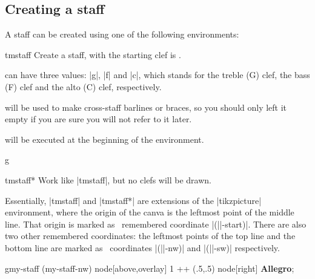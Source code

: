 \subsection{Creating a staff}\label{sec:init:staff-creation}
A staff can be created using one of the following environments:
\begin{environment}{{tmstaff}}
  Create a staff, with the starting clef is .

   can have three values: |g|, |f| and |c|, which stands for 
  the treble (G) clef, the bass (F) clef and the alto (C) clef, respectively.

   will be used to make cross-staff barlines or braces, so 
  you should only left it empty if you are sure you will not refer to it later.

   will be executed at the beginning of the environment.
\end{environment}
\begin{codeexample}[]
\begin{tmline}[staff offset=1cm]
\begin{tmstaff}{g}{}\end{tmstaff}
\end{tmline}
\end{codeexample}
\begin{environment}{{tmstaff*}}
  Work like |{tmstaff}|, but no clefs will be drawn.
\end{environment}
Essentially, |{tmstaff}| and |{tmstaff*}| are extensions of the 
|{tikzpicture}| environment, where the origin of the canva is the leftmost 
point of the middle line. That origin is marked as \tikzname\ remembered 
coordinate |(||-start)|. There are also two other remembered 
coordinates: the leftmost points of the top line and the bottom line are marked 
as \tikzname\ coordinates |(||-nw)| and |(||-sw)| 
respectively.
\begin{codeexample}[]
\begin{tmline}
\begin{tmstaff}{g}{my-staff}
  \path (my-staff-nw) node[above,overlay] {1} ++ (.5,.5) node[right] {\bfseries Allegro};
\end{tmstaff}
\end{tmline}
\end{codeexample}
